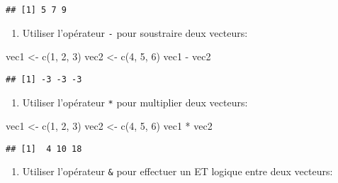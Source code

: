 \documentclass[
]{article}
\newenvironment{Shaded}{\begin{snugshade}}{\end{snugshade}}
\newcommand{\DecValTok}[1]{\textcolor[rgb]{0.00,0.00,0.81}{#1}}
\newcommand{\FunctionTok}[1]{\textcolor[rgb]{0.00,0.00,0.00}{#1}}
\newcommand{\NormalTok}[1]{#1}
\newcommand{\OtherTok}[1]{\textcolor[rgb]{0.56,0.35,0.01}{#1}}
\newcommand{\SpecialCharTok}[1]{\textcolor[rgb]{0.00,0.00,0.00}{#1}}
\providecommand{\tightlist}{%
  \setlength{\itemsep}{0pt}\setlength{\parskip}{0pt}}
\begin{document}
\begin{verbatim}
## [1] 5 7 9
\end{verbatim}

\begin{enumerate}
\def\labelenumi{\arabic{enumi}.}
\setcounter{enumi}{1}
\tightlist
\item
  Utiliser l'opérateur \texttt{-} pour soustraire deux vecteurs:
\end{enumerate}

\begin{Shaded}
\begin{Highlighting}[]
\NormalTok{vec1 }\OtherTok{\textless{}{-}} \FunctionTok{c}\NormalTok{(}\DecValTok{1}\NormalTok{, }\DecValTok{2}\NormalTok{, }\DecValTok{3}\NormalTok{)}
\NormalTok{vec2 }\OtherTok{\textless{}{-}} \FunctionTok{c}\NormalTok{(}\DecValTok{4}\NormalTok{, }\DecValTok{5}\NormalTok{, }\DecValTok{6}\NormalTok{)}
\NormalTok{vec1 }\SpecialCharTok{{-}}\NormalTok{ vec2}
\end{Highlighting}
\end{Shaded}

\begin{verbatim}
## [1] -3 -3 -3
\end{verbatim}

\begin{enumerate}
\def\labelenumi{\arabic{enumi}.}
\setcounter{enumi}{2}
\tightlist
\item
  Utiliser l'opérateur \texttt{*} pour multiplier deux vecteurs:
\end{enumerate}

\begin{Shaded}
\begin{Highlighting}[]
\NormalTok{vec1 }\OtherTok{\textless{}{-}} \FunctionTok{c}\NormalTok{(}\DecValTok{1}\NormalTok{, }\DecValTok{2}\NormalTok{, }\DecValTok{3}\NormalTok{)}
\NormalTok{vec2 }\OtherTok{\textless{}{-}} \FunctionTok{c}\NormalTok{(}\DecValTok{4}\NormalTok{, }\DecValTok{5}\NormalTok{, }\DecValTok{6}\NormalTok{)}
\NormalTok{vec1 }\SpecialCharTok{*}\NormalTok{ vec2}
\end{Highlighting}
\end{Shaded}

\begin{verbatim}
## [1]  4 10 18
\end{verbatim}

\begin{enumerate}
\def\labelenumi{\arabic{enumi}.}
\setcounter{enumi}{3}
\tightlist
\item
  Utiliser l'opérateur \texttt{\&} pour effectuer un ET logique entre deux vecteurs:
\end{enumerate}
\end{document}
